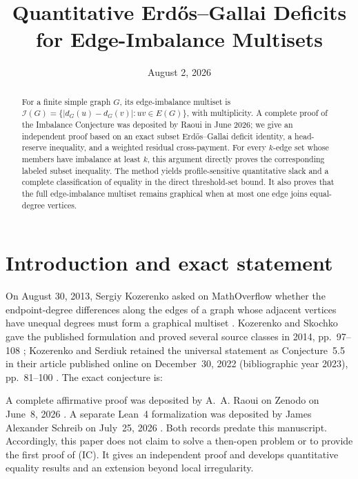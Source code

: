 \documentclass[a4paper,11pt]{amsart}
\title{Quantitative Erd\H{o}s--Gallai Deficits for Edge-Imbalance Multisets}
\date{August 2, 2026}
\numberwithin{equation}{section}
\theoremstyle{definition}
\theoremstyle{remark}
\newcommand{\Ical}{\mathcal I}
\begin{document}
\begin{abstract}
For a finite simple graph $G$, its edge-imbalance multiset is $\Ical(G)=\{\lvert d_G(u)-d_G(v)\rvert:uv\in E(G)\}$, with multiplicity.
A complete proof of the Imbalance Conjecture was deposited by Raoui in June 2026; we give an independent proof based on an exact subset Erd\H{o}s--Gallai deficit identity, a head-reserve inequality, and a weighted residual cross-payment.
For every $k$-edge set whose members have imbalance at least $k$, this argument directly proves the corresponding labeled subset inequality.
The method yields profile-sensitive quantitative slack and a complete classification of equality in the direct threshold-set bound.
It also proves that the full edge-imbalance multiset remains graphical when at most one edge joins equal-degree vertices.
\end{abstract}

\maketitle

\section{Introduction and exact statement}

On August 30, 2013, Sergiy Kozerenko asked on MathOverflow whether the endpoint-degree differences along the edges of a graph whose adjacent vertices have unequal degrees must form a graphical multiset \cite{KozerenkoMO2013}.  Kozerenko and Skochko gave the published formulation and proved several source classes in 2014, pp.~97--108 \cite{KozerenkoSkochko2014}; Kozerenko and Serdiuk retained the universal statement as Conjecture~5.5 in their article published online on December~30, 2022 (bibliographic year 2023), pp.~81--100 \cite{KozerenkoSerdiuk2023}.  The exact conjecture is:
\begin{center}
\end{center}
A complete affirmative proof was deposited by A.~A. Raoui on Zenodo on June~8, 2026 \cite{Raoui2026}.  A separate Lean~4 formalization was deposited by James Alexander Schreib on July~25, 2026 \cite{Schreib2026}.  Both records predate this manuscript.  Accordingly, this paper does not claim to solve a then-open problem or to provide the first proof of \textup{(IC)}.  It gives an independent proof and develops quantitative equality results and an extension beyond local irregularity.
\end{document}
